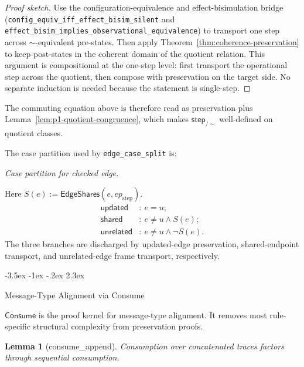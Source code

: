 \documentclass[a4paper,10pt,twocolumn,english]{article}
\makeatletter
\renewcommand{\section}{\@startsection{section}{1}{\z@}%
  {-3.5ex \@plus -1ex \@minus -.2ex}%
  {2.3ex}%
  {\raggedright\normalfont\large\bfseries}}
\numberwithin{equation}{section}
\theoremstyle{paperdef}
\theoremstyle{paperplain}
\newtheorem{lemma}[definition]{Lemma}
\theoremstyle{paperdef}
\theoremstyle{paperremark}
\newcommand{\Consume}{\ensuremath{\mathsf{Consume}}}
\newcommand{\EdgeShares}{\ensuremath{\mathsf{EdgeShares}}}
\newcommand{\eqnote}[1]{\par\noindent\textit{#1.}\par\vspace{2pt}}
\makeatother
\begin{document}
\begin{proof}[Proof sketch]
	Use the configuration-equivalence and effect-bisimulation bridge
	(\nolinkurl{config_equiv_iff_effect_bisim_silent} and
	\nolinkurl{effect_bisim_implies_observational_equivalence}) to transport one
	step across $\sim$-equivalent pre-states. Then apply
	Theorem~\ref{thm:coherence-preservation} to keep post-states in the coherent
	domain of the quotient relation.
	This argument is compositional at the one-step level: first transport the
	operational step across the quotient, then compose with preservation on the
	target side. No separate induction is needed because the statement is single-step.
\end{proof}

The commuting equation above is therefore read as preservation plus
Lemma~\ref{lem:p1-quotient-congruence}, which makes $\mathsf{step}_{/\sim}$
well-defined on quotient classes.

The case partition used by \nolinkurl{edge_case_split} is:
\eqnote{Case partition for checked edge}
Here $S(e):=\EdgeShares(e,ep_{\mathrm{step}})$.
\begin{equation}
	\begin{aligned}
		\mathsf{updated}   & :\ e=u;                    \\
		\mathsf{shared}    & :\ e\neq u\land S(e);      \\
		\mathsf{unrelated} & :\ e\neq u\land \neg S(e).
	\end{aligned}
\end{equation}
The three branches are discharged by updated-edge preservation, shared-endpoint transport, and unrelated-edge frame transport, respectively.

\section{Message-Type Alignment via Consume}
\label{sec:consume}

$\Consume$ is the proof kernel for message-type alignment. It removes most rule-specific structural complexity from preservation proofs.

\begin{lemma}[consume\_append]
	Consumption over concatenated traces factors through sequential consumption.
\end{lemma}
\end{document}

